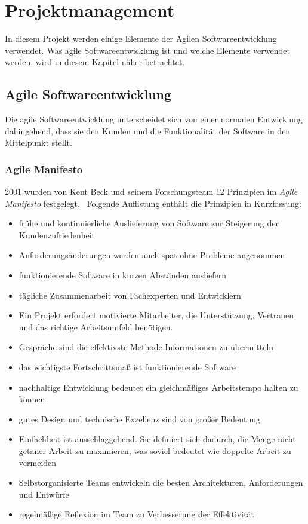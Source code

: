 \chapter{Projektmanagement}

In diesem Projekt werden einige Elemente der Agilen Softwareentwicklung verwendet. Was agile Softwareentwicklung ist und welche Elemente verwendet werden, wird in diesem Kapitel näher betrachtet.

\section{Agile Softwareentwicklung}

Die agile Softwareentwicklung unterscheidet sich von einer normalen Entwicklung dahingehend, dass sie den Kunden und die Funktionalität der Software in den Mittelpunkt stellt. ~\cite{F_Agile_2.1} 

\subsection{Agile Manifesto}
2001 wurden von Kent Beck und seinem Forschungsteam 12 Prinzipien im \textit{Agile Manifesto} festgelegt.~\cite{F_AgilesManifest_2.1} Folgende Auflistung enthält die Prinzipien in Kurzfassung:

\begin{itemize}
\item frühe und kontinuierliche Auslieferung von Software zur Steigerung der Kundenzufriedenheit
\item Anforderungsänderungen werden auch spät ohne Probleme angenommen
\item funktionierende Software in kurzen Abständen ausliefern
\item tägliche Zusammenarbeit von Fachexperten und Entwicklern
\item Ein Projekt erfordert motivierte Mitarbeiter, die Unterstützung, Vertrauen und das richtige Arbeitsumfeld benötigen.
\item Gespräche sind die effektivste Methode Informationen zu übermitteln
\item das wichtigste Fortschrittsmaß ist funktionierende Software
\item nachhaltige Entwicklung bedeutet ein gleichmäßiges Arbeitstempo halten zu können
\item gutes Design und technische Exzellenz sind von großer Bedeutung
\item Einfachheit ist ausschlaggebend. Sie definiert sich dadurch, die Menge nicht getaner Arbeit zu maximieren, was soviel bedeutet wie doppelte Arbeit zu vermeiden
\item Selbstorganisierte Teams entwickeln die besten Architekturen, Anforderungen und Entwürfe
\item regelmäßige Reflexion im Team zu Verbesserung der Effektivität
\end{itemize}

